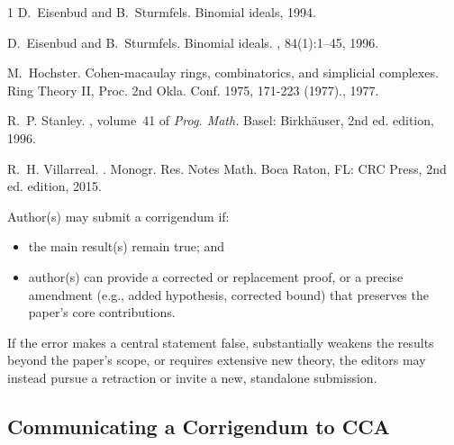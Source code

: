 \documentclass[12pt]{article}
\begin{document}
\begin{thebibliography}{1}
D.~Eisenbud and B.~Sturmfels.
\newblock Binomial ideals, 1994.
\newblock {}

D.~Eisenbud and B.~Sturmfels.
\newblock Binomial ideals.
, 84(1):1--45, 1996.
\newblock {}

M.~Hochster.
\newblock Cohen-macaulay rings, combinatorics, and simplicial complexes.
\newblock Ring {Theory} {II}, {Proc}. 2nd {Okla}. {Conf}. 1975, 171-223
  (1977)., 1977.

R.~P. Stanley.
, volume~41 of {\em Prog.
  Math.}
\newblock Basel: Birkh{\"a}user, 2nd ed. edition, 1996.
\newblock {}

R.~H. Villarreal.
.
\newblock Monogr. Res. Notes Math. Boca Raton, FL: CRC Press, 2nd ed. edition,
  2015.
\newblock {}

\end{thebibliography}




Author(s)  may submit a corrigendum if:
\begin{itemize}
\item the main result(s) remain true; and
\item author(s) can provide a corrected or replacement proof, or a
  precise amendment (e.g., added hypothesis, corrected bound) that
  preserves the paper’s core contributions.
\end{itemize}

If the error makes a central statement false, substantially weakens
the results beyond the paper’s scope, or requires extensive new
theory, the editors may instead pursue a retraction or invite a new,
standalone submission.


\subsection*{Communicating a Corrigendum to CCA}
\end{document}
